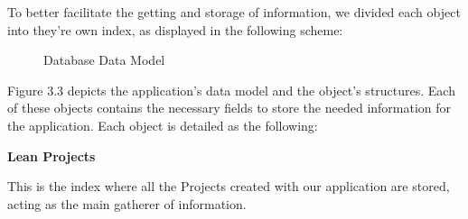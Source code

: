 \documentclass[a4paper,twoside,10pt]{report}
\begin{document}
To better facilitate the getting and storage of information, we divided each object into they're own index, as displayed in the following scheme:

\begin{figure}[h!]
    \center
    \caption{Database Data Model}
\end{figure}

Figure 3.3 depicts the application's data model and the object's structures. Each of these objects contains the necessary fields to store the needed information for the application. 
\newpage
Each object is detailed as the following:
\newline

\textbf{Lean Projects}

This is the index where all the Projects created with our application are stored, acting as the main gatherer of information.
\end{document}
